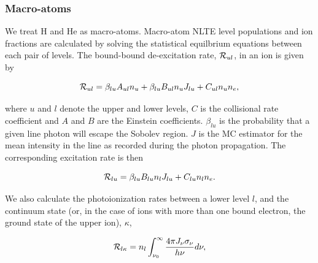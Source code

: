 \documentclass[preprint, a4paper, 11pt]{aastex}
\begin{document}



\subsubsection{Macro-atoms}
We treat H and He as macro-atoms. 
Macro-atom NLTE level populations and ion fractions are calculated by solving 
the statistical equilbrium equations between each pair of levels. The bound-bound 
de-excitation rate, ${\cal R}_{ul}$, in an ion is given by

\begin{equation}
{\cal R}_{ul} = \beta_{lu} A_{ul} n_u + \beta_{lu} B_{ul} n_u J_{lu} + C_{ul} n_u n_e,\label{eq:nlte_rul}
\end{equation}

where $u$ and $l$ denote the upper and lower levels, $C$ is the collisional rate coefficient
and $A$ and $B$ are the Einstein coefficients. $\beta_{lu}$ is the probability that a 
given line photon will escape the Sobolev region. $J$ is the MC estimator for the mean intensity in the line as 
recorded during the photon propagation. The corresponding excitation rate is then

\begin{equation}
{\cal R}_{lu} = \beta_{lu} B_{lu} n_l J_{lu} + C_{lu} n_l n_e.
\end{equation}

We also calculate the photoionization rates between a lower level $l$,
and the continuum state (or, in the case of ions with more than one 
bound electron, the ground state of the upper ion), $\kappa$,

\begin{equation}
{\cal R}_{l \kappa}= n_l \int_{\nu_0}^{\infty} \frac{ 4 \pi J_{\nu} \sigma_{\nu}}{h \nu} d\nu,
\end{equation}
\end{document}
